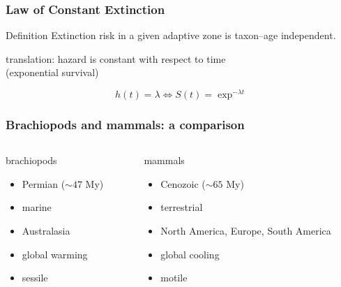 \documentclass{beamer} \usepackage{amsmath,amsthm}
\begin{document}
\begin{frame}
  \frametitle{Law of Constant Extinction}

  \begin{alertblock}{Definition}
      Extinction risk in a given adaptive zone is taxon--age independent.

      \tiny{}
  \end{alertblock}

  \begin{center}
    translation: hazard is constant with respect to time \\(\alert{exponential survival})
  \end{center}

  \[
    h(t) = \lambda \iff S(t) = \exp^{-\lambda t}
  \]

\end{frame}

\begin{frame}
  \frametitle{Brachiopods and mammals: a comparison}

  \begin{columns}
    \begin{column}{0.5\textwidth}
      \begin{block}{brachiopods}
        \begin{itemize}
          \item Permian (\(\sim 47\) My)
          \item marine
          \item Australasia
          \item global warming
          \item sessile
        \end{itemize}
      \end{block}
    \end{column}
    \begin{column}{0.5\textwidth}
      \begin{block}{mammals}
        \begin{itemize}
          \item Cenozoic (\(\sim 65\) My)
          \item terrestrial
          \item North America, Europe, South America
          \item global cooling
          \item motile
        \end{itemize}
      \end{block}
    \end{column}
  \end{columns}
\end{frame}
\end{document}
